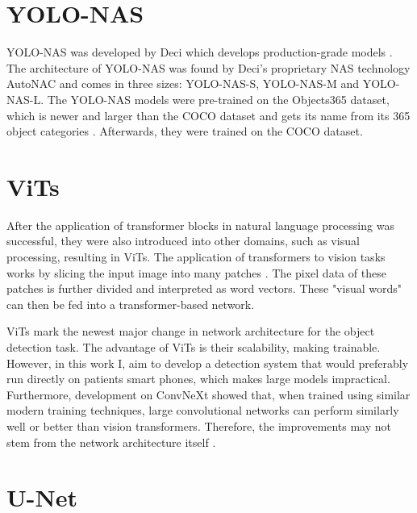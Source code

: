 \documentclass[10pt]{book}
\begin{document}
\section{YOLO-NAS}

\ac{YOLO}-NAS was developed by Deci which develops production-grade models \cite{terven2023comprehensive}. The architecture of \ac{YOLO}-NAS was found by Deci's proprietary \ac{NAS} technology AutoNAC and comes in three sizes: \ac{YOLO}-NAS-S, \ac{YOLO}-NAS-M and \ac{YOLO}-NAS-L. The \ac{YOLO}-NAS models were pre-trained on the Objects365 dataset, which is newer and larger than the \ac{COCO} dataset and gets its name from its 365 object categories \cite{shao2019objects365}. Afterwards, they were trained on the \ac{COCO} dataset.


\section{ViTs}

After the application of transformer blocks in natural language processing was successful, they were also introduced into other domains, such as visual processing, resulting in \acp{ViT}. The application of transformers to vision tasks works by slicing the input image into many patches \cite{dosovitskiy2020image}. The pixel data of these patches is further divided and interpreted as word vectors. These "visual words" can then be fed into a transformer-based network.

\acp{ViT} mark the newest major change in network architecture for the object detection task. The advantage of \acp{ViT} is their scalability, making \cite[models of unprecedented size]{dosovitskiy2020image} trainable. However, in this work I, aim to develop a detection system that would preferably run directly on patients smart phones, which makes large models impractical. Furthermore, development on ConvNeXt showed that, when trained using similar modern training techniques, large convolutional networks can perform similarly well or better than vision transformers. Therefore, the improvements may not stem from the network architecture itself \cite{liu2022convnet}.

\section{U-Net}
\end{document}
